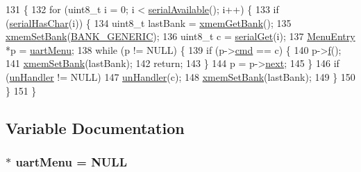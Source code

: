\begin{DoxyCode}
131                         \{
132     \textcolor{keywordflow}{for} (uint8\_t i = 0; i < \hyperlink{group__uart_ga1ea963b291215ad9c5e8a0610f116b90}{serialAvailable}(); i++) \{
133         \textcolor{keywordflow}{if} (\hyperlink{group__uart_ga266a54dcf3c4b85d92bf6b16bdcb5069}{serialHasChar}(i)) \{
134             uint8\_t lastBank = \hyperlink{group__xmem_ga575f63170f6fc636556f8d955cbd42cd}{xmemGetBank}();
135             \hyperlink{group__xmem_ga619fa66b9f38be684f4331951fc91730}{xmemSetBank}(\hyperlink{group__xmem_ga6b1167d0078b33af8ec17ededaebe0cb}{BANK\_GENERIC});
136             uint8\_t c = \hyperlink{group__uart_gaa9d6e44600b215154c3f66193df151f6}{serialGet}(i);
137             \hyperlink{struct_menu_entry}{MenuEntry} *p = \hyperlink{group__uartmenu_gaedd623ea603861db72748b5b03859ba9}{uartMenu};
138             \textcolor{keywordflow}{while} (p != NULL) \{
139                 \textcolor{keywordflow}{if} (p->\hyperlink{struct_menu_entry_a4d43e8212bdc9dbee866506f04effcea}{cmd} == c) \{
140                     p->\hyperlink{struct_menu_entry_afe96196d3564b9577477236d13329241}{f}();
141                     \hyperlink{group__xmem_ga619fa66b9f38be684f4331951fc91730}{xmemSetBank}(lastBank);
142                     \textcolor{keywordflow}{return};
143                 \}
144                 p = p->\hyperlink{struct_menu_entry_af79f4060fda1c0b572c15c3dd99b09a5}{next};
145             \}
146             \textcolor{keywordflow}{if} (\hyperlink{group__uartmenu_ga59944eadba9321ee37f247a13bc8ec1a}{unHandler} != NULL)
147                 \hyperlink{group__uartmenu_ga59944eadba9321ee37f247a13bc8ec1a}{unHandler}(c);
148             \hyperlink{group__xmem_ga619fa66b9f38be684f4331951fc91730}{xmemSetBank}(lastBank);
149         \}
150     \}
151 \}
\end{DoxyCode}


\subsection{Variable Documentation}
\hypertarget{group__uartmenu_gaedd623ea603861db72748b5b03859ba9}{
\subsubsection[{uart\-Menu}]{$\ast$ uart\-Menu = N\-U\-L\-L}}\label{group__uartmenu_gaedd623ea603861db72748b5b03859ba9}


